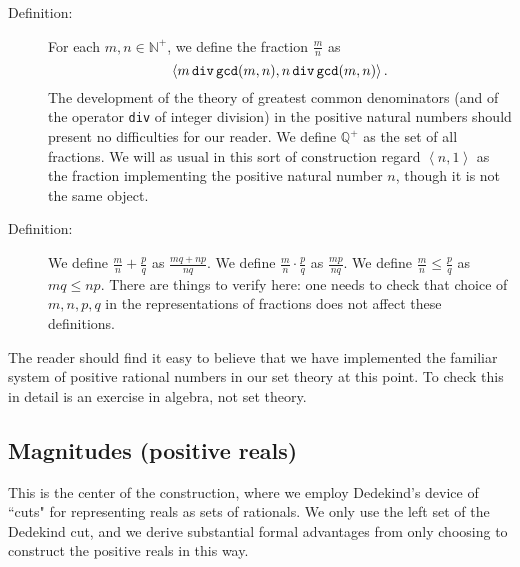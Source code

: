 \documentclass[12pt]{book}
\begin{document}
\begin{description}

\item[Definition:]  For each $m,n \in {\mathbb N}^+$, we define the fraction $\frac mn$ as $$\left<m \,{\tt div}\, {\tt gcd}(m,n),n \,{\tt div}\, {\tt gcd}(m,n)\right>.$$  The development of the theory of greatest common denominators (and of the operator {\tt div} of integer division) in the positive natural numbers should present no difficulties for our reader.  We define ${\mathbb Q}^+$ as the set of all fractions.  We will as usual in this sort of construction regard $\left<n,1\right>$ as the fraction implementing the positive natural number $n$, though it is not the same object.

\item[Definition:]  We define $\frac mn + \frac pq$ as $\frac{mq+np}{nq}$.  We define $\frac mn \cdot \frac pq$ as $\frac{mp}{nq}$.  We define $\frac mn \leq \frac pq$ as
$mq \leq np$.  There are things to verify here:   one needs to check that choice of $m,n,p,q$ in the representations of fractions does not affect these definitions.

\end{description}

The reader should find it easy to believe that we have implemented the familiar system of positive rational numbers in our set theory at this point.  To check this in detail is an exercise in algebra, not set theory.

\subsection{Magnitudes (positive reals)}

This is the center of the construction, where we employ Dedekind's device of ``cuts" for representing reals as sets of rationals.  We only use the left set of the Dedekind cut, and we derive substantial formal advantages from only choosing to construct the positive reals in this way.
\end{document}
